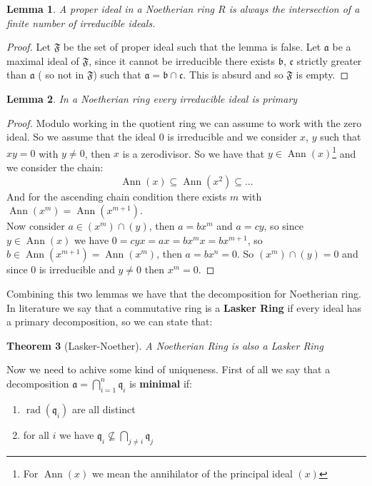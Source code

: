 \documentclass[]{book}
\theoremstyle{plain}
\newtheorem{teo}{Theorem}[section]
\newtheorem{lem}[teo]{Lemma}
\theoremstyle{remark}
\theoremstyle{definition}
\newcommand{\q}{\mathfrak{q}}
\newcommand{\A}{\mathfrak{a}}
\newcommand{\B}{\mathfrak{b}}
\newcommand{\Cc}{\mathfrak{c}}
\DeclareMathOperator{\rad}{rad}
\DeclareMathOperator{\Ann}{Ann}
\begin{document}
\begin{lem}
	A proper ideal in a Noetherian ring $ R $ is always the intersection of a finite number of irreducible ideals.
\end{lem}

\begin{proof}
	Let $ \mathfrak{F} $ be the set of proper ideal such that the lemma is false. Let $ \A $ be a maximal ideal of $ \mathfrak{F} $, since it cannot be irreducible there exists $ \B $, $ \Cc $ strictly greater than $ \A $ ( so not in $ \mathfrak{F} $) such that $ \A = \B \cap \Cc $. This is absurd and so $ \mathfrak{F} $ is empty.
\end{proof}

\begin{lem}
	In a Noetherian ring every irreducible ideal is primary
\end{lem}

\begin{proof}
Modulo working in the quotient ring we can assume to work with the zero ideal. So we assume that the ideal $ 0 $ is irreducible and we consider $ x$, $y $ such that $ xy = 0 $ with $ y\neq 0 $, then $ x $ is a zerodivisor. So we have that $ y \in \Ann(x) $\footnote{For $ \Ann(x) $ we mean the annihilator of the principal ideal $ (x) $} and we consider the chain:
$$ \Ann(x)  \subseteq \Ann(x^2) \subseteq ...$$
And for the ascending chain condition there exists $ m $ with $ \Ann(x^m)= \Ann(x^{m+1})$. \\
Now consider $ a \in (x^m)\cap (y) $, then $ a = bx^m $ and $ a = cy $, so since $ y \in \Ann(x) $ we have $ 0 = cyx = ax = bx^m x=  bx^{m+1}$, so $ b \in  \Ann(x^{m+1}) = \Ann(x^m) $, then $ a = bx^n = 0 $. So $ (x^m)\cap (y)=0 $ and since $ 0 $ is irreducible and $ y\neq 0 $ then $ x^m=0 $. 
\end{proof}

Combining this two lemmas we have that the decomposition for Noetherian ring. In literature we say that a commutative ring is a \textbf{Lasker Ring} if every ideal has a primary decomposition, so we can state that:

\begin{teo}[Lasker-Noether]
A Noetherian Ring is also a Lasker Ring
\end{teo}
Now we need to achive some kind of uniqueness. First of all we say that a decomposition $ \A = \bigcap_{i=1}^n \q_i $ is \textbf{minimal} if:
\begin{enumerate}
\item $ \rad(\q_i) $ are all distinct
\item for all $ i $ we have $ \q_i \not \subseteq \bigcap_{j\neq i} \q_j $
\end{enumerate}
\end{document}
